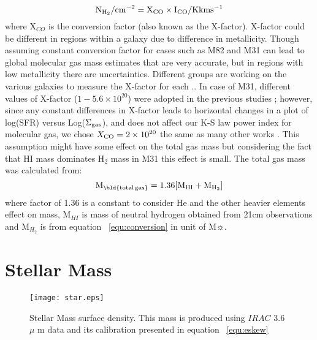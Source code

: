 \documentclass[useAMS,usenatbib]{mn2e}
\begin{document}
\begin{equation}
\label{equ:conversion}
\rm N_{H_2}/\rm cm^{-2} = X_{CO} \times I_{CO}/\rm K km s^{-1}
\end{equation}
where X$_{CO}$ is the conversion factor (also known as the X-factor). X-factor could be different in regions within a galaxy due to difference in metallicity. Though assuming constant conversion factor for cases such as M82 and M31 can lead to global molecular gas mass estimates that are very accurate,  but in regions with low metallicity there are uncertainties. Different groups are working on the various galaxies to measure the X-factor for each \citep{Wilson95, Bosselli02, Bolato13}.. In case of M31, different values of X-factor ($1-5.6 \times 10^{20}$) were adopted in the previous studies \citep[e.g.][]{Ford13, Bolato13, Leroy11, Bolato08, Nieten06}; however, since any constant differences in X-factor leads to horizontal changes in a plot of log(SFR) versus Log($\Sigma_{\rm {gas}}$), and does not affect our K-S law power index for molecular gas,  we chose $X_{\rm {CO}}= 2 \times 10^{20}$  the same as many other works \citep[e.g.][]{Ford13, Smith12}. This assumption might have some effect on the total gas mass but considering the fact that HI mass dominates H$_2$ mass in M31 this effect is small.
The total gas mass was calculated from:
\begin{equation}
\label{equ:total_gas}
\rm M_{\rm \bld {total \, gas}} = 1.36[M_{HI}+M_{H_2}]
\end{equation}
where  factor of 1.36 is a constant to consider He and the other heavier elements effect on mass, M$_{HI}$ is mass of neutral hydrogen obtained from 21cm observations and M$_{H_2}$ is from equation ~\ref{equ:conversion} in unit of M$\sun$.

\section{Stellar Mass}
\label{sec:starmass}
\begin{figure*}
\centering
\texttt{[image: star.eps]}
\caption{Stellar Mass surface density. This mass is produced using $IRAC$ 3.6 $\mu$ m data and its calibration presented in equation ~\ref{equ:eskew}}
\label{fig:stellarmass}
\end{figure*}
\end{document}
